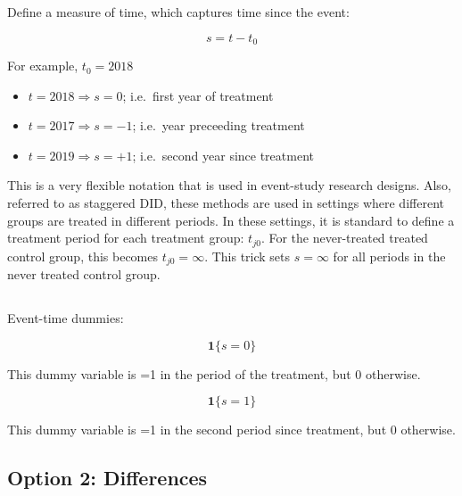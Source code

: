 \documentclass[
  letterpaper,
  DIV=11,
  numbers=noendperiod]{scrartcl}
\begin{document}
Define a measure of time, which captures time since the event:

\[
  s = t-t_0
\]

For example, \(t_0 = 2018\)

\begin{itemize}
\item
  \(t=2018\Rightarrow s = 0\); i.e.~first year of treatment
\item
  \(t=2017\Rightarrow s = -1\); i.e.~year preceeding treatment
\item
  \(t=2019\Rightarrow s = +1\); i.e.~second year since treatment
\end{itemize}

\begin{tcolorbox}[enhanced jigsaw, opacitybacktitle=0.6, colbacktitle=quarto-callout-note-color!10!white, rightrule=.15mm, colframe=quarto-callout-note-color-frame, bottomtitle=1mm, breakable, leftrule=.75mm, colback=white, toprule=.15mm, toptitle=1mm, left=2mm, title=\textcolor{quarto-callout-note-color}{\faInfo}\hspace{0.5em}{Note}, coltitle=black, arc=.35mm, titlerule=0mm, bottomrule=.15mm, opacityback=0]

This is a very flexible notation that is used in event-study research
designs. Also, referred to as staggered DID, these methods are used in
settings where different groups are treated in different periods. In
these settings, it is standard to define a treatment period for each
treatment group: \(t_{j0}\). For the never-treated treated control
group, this becomes \(t_{j0}=\infty\). This trick sets \(s = \infty\)
for all periods in the never treated control group.

\end{tcolorbox}

\subsection{}\label{section-12}

Event-time dummies:

\[
  \mathbf{1}\{s = 0\}
\]

This dummy variable is =1 in the period of the treatment, but 0
otherwise.

\[
  \mathbf{1}\{s = 1\}
\]

This dummy variable is =1 in the second period since treatment, but 0
otherwise.

\subsection{Option 2: Differences}\label{option-2-differences}
\end{document}
